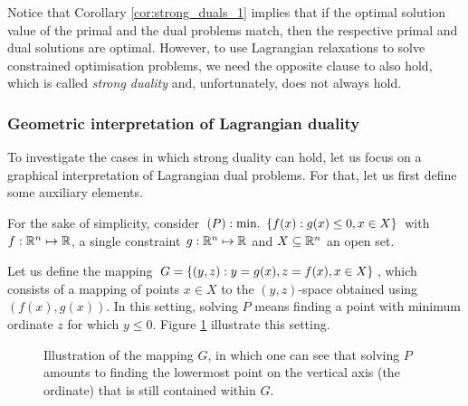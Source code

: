 Notice that Corollary \ref{cor:strong_duals_1} implies that if the optimal solution value of the primal and the dual problems match, then the respective primal and dual solutions are optimal. However, to use Lagrangian relaxations to solve constrained optimisation problems, we need the opposite clause to also hold, which is called \emph{strong duality} and, unfortunately, does not always hold.

\subsubsection{Geometric interpretation of Lagrangian duality}

To investigate the cases in which strong duality can hold, let us focus on a graphical interpretation of Lagrangian dual problems. For that, let us first define some auxiliary elements. 

For the sake of simplicity, consider $(P) : \mathop{\text{min.~}}\left\{ f(x) : g(x) \leq 0, x \in X \right \}$ with $f : \mathbb{R}^n \mapsto \mathbb{R}$, a single constraint $g:\mathbb{R}^n \mapsto \mathbb{R}$ and $X \subseteq \mathbb{R}^n$ an open set.

Let us define the mapping $G = \left\{ (y,z) : y = g(x), z = f(x), x \in X \right \}$, which consists of a mapping of points $x \in X$ to the $(y,z)$-space obtained using $(f(x), g(x))$. In this setting, solving $P$ means finding a point with minimum ordinate $z$ for which $y \leq 0$. Figure \ref{fig:generic_G} illustrate this setting.
%
\begin{figure}[h]
	\caption{Illustration of the mapping $G$, in which one can see that solving $P$ amounts to finding the lowermost point on the vertical axis (the ordinate) that is still contained within $G$.} \label{fig:generic_G}	
\end{figure}
%

